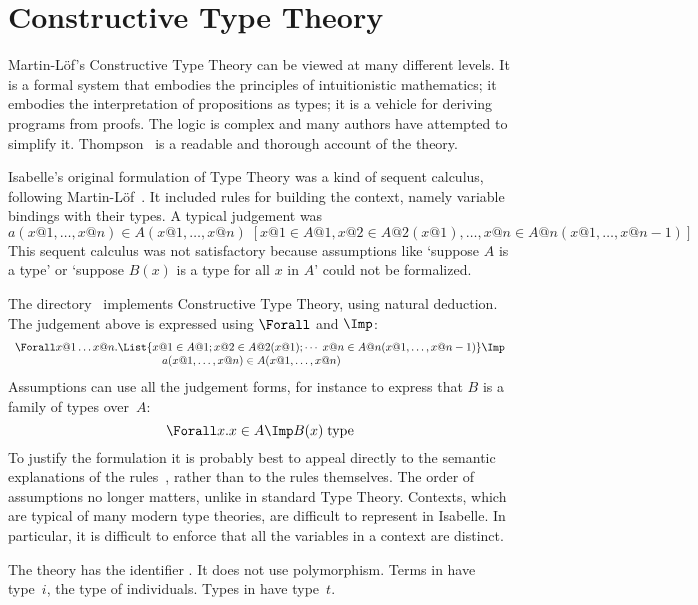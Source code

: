 \chapter{Constructive Type Theory}
Martin-L\"of's Constructive Type Theory \cite{martinlof84,nordstrom90} can
be viewed at many different levels.  It is a formal system that embodies
the principles of intuitionistic mathematics; it embodies the
interpretation of propositions as types; it is a vehicle for deriving
programs from proofs.  The logic is complex and many authors have attempted
to simplify it.  Thompson~\cite{thompson91} is a readable and thorough
account of the theory.

Isabelle's original formulation of Type Theory was a kind of sequent
calculus, following Martin-L\"of~\cite{martinlof84}.  It included rules for
building the context, namely variable bindings with their types.  A typical
judgement was
\[   a(x@1,\ldots,x@n)\in A(x@1,\ldots,x@n) \; 
    [ x@1\in A@1, x@2\in A@2(x@1), \ldots, x@n\in A@n(x@1,\ldots,x@{n-1}) ]
\]
This sequent calculus was not satisfactory because assumptions like
`suppose $A$ is a type' or `suppose $B(x)$ is a type for all $x$ in $A$'
could not be formalized.  

The directory~ implements Constructive Type Theory, using
natural deduction.  The judgement above is expressed using $\Forall$ and
$\Imp$:
\[ \begin{array}{r@{}l}
     \Forall x@1\ldots x@n. &
          \List{x@1\in A@1; 
                x@2\in A@2(x@1); \cdots \; 
                x@n\in A@n(x@1,\ldots,x@{n-1})} \Imp \\
     &  \qquad\qquad a(x@1,\ldots,x@n)\in A(x@1,\ldots,x@n) 
    \end{array}
\]
Assumptions can use all the judgement forms, for instance to express that
$B$ is a family of types over~$A$:
\[ \Forall x . x\in A \Imp B(x)\;{\rm type} \]
To justify the {\CTT} formulation it is probably best to appeal directly
to the semantic explanations of the rules~\cite{martinlof84}, rather than
to the rules themselves.  The order of assumptions no longer matters,
unlike in standard Type Theory.  Contexts, which are typical of many modern
type theories, are difficult to represent in Isabelle.  In particular, it
is difficult to enforce that all the variables in a context are distinct.

The theory has the {\ML} identifier .  It does not
use polymorphism.  Terms in {\CTT} have type~$i$, the type of individuals.
Types in {\CTT} have type~$t$.

